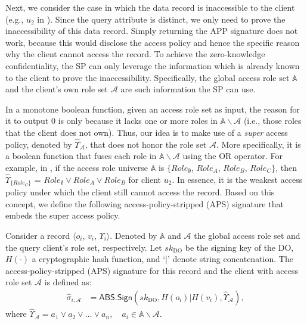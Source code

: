 Next, we consider the case in which the data record is inaccessible to the client (e.g., $u_2$ in ). Since the query attribute is distinct, we only need to prove the inaccessibility of this data record. Simply returning the APP signature does not work, because this would disclose the access policy and hence the specific reason why the client cannot access the record. To achieve the zero-knowledge confidentiality, the SP can only leverage the information which is already known to the client to prove the inaccessibility. Specifically, the global access role set $\mathbb{A}$ and the client's own role set $\mathcal{A}$ are such information the SP can use.

In a monotone boolean function, given an access role set as input, the reason for it to output 0 is only because it lacks one or more roles in $\mathbb{A}\backslash\mathcal{A}$ (i.e., those roles that the client does not own). Thus, our idea is to make use of a \emph{super} access policy, denoted by $\hat{\Upsilon}_{\mathcal{A}}$, that does not honor the role set $\mathcal{A}$. More specifically, it is a boolean function that fuses each role in $\mathbb{A}\backslash\mathcal{A}$ using the OR operator. For example, in , if the access role universe $\mathbb{A}$ is $\{{Role}_{\emptyset}$, ${Role}_A$, ${Role}_B$, ${Role}_C\}$,
then
$\hat{\Upsilon}_{\{{Role}_C \}}$ = ${Role}_{\emptyset} \lor {Role}_A \lor {Role}_B$ for client $u_2$. In essence, it is the weakest access policy under which the client still cannot access the record. Based on this concept, we define the following access-policy-stripped (APS) signature that embeds the super access policy.

\begin{definition}
  Consider a record $\langle o_i$, $v_i$, $\Upsilon_i\rangle$. Denoted by $\mathbb{A}$ and $\mathcal{A}$ the global access role set and the query client's role set, respectively. Let ${sk}_{\textrm{DO}}$ be the signing key of the DO, $H(\cdot)$ a cryptographic hash function, and `$|$' denote string concatenation. The access-policy-stripped (APS) signature for this record and the client with access role set $\mathcal{A}$ is defined as:
  \begin{align*}
    \hat{\sigma}_{i, \mathcal{A}} & = \textsf{ABS.Sign}({sk}_{\textrm{DO}}, H(o_i) | H(v_i) , \hat{\Upsilon}_{\mathcal{A}}),
  \end{align*}
  where $\hat{\Upsilon}_{\mathcal{A}} = a_1 \lor a_2 \lor \dots \lor a_n, \quad a_i \in \mathbb{A}\backslash\mathcal{A}$.
\end{definition}

